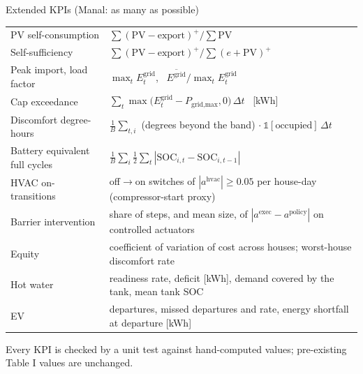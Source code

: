 \documentclass[aspectratio=169,10pt]{beamer}
\newcommand{\SOC}{\mathrm{SOC}}
\begin{document}
\begin{frame}{Extended KPIs (Manal: as many as possible)}
\small
\begin{tabularx}{\textwidth}{@{}l>{\raggedright\arraybackslash}X@{}}
\toprule
PV self-consumption & $\sum (\mathrm{PV} - \text{export})^+ / \sum \mathrm{PV}$ \\
Self-sufficiency & $\sum (\mathrm{PV} - \text{export})^+ / \sum (e + \mathrm{PV})^+$ \\
Peak import, load factor & $\max_t E^{\text{grid}}_t$, \ $\overline{E^{\text{grid}}} / \max_t E^{\text{grid}}_t$ \\
Cap exceedance & $\sum_t \max\big(E^{\text{grid}}_t - P_{\text{grid,max}}, 0\big)\,\Delta t$ \ [kWh] \\
Discomfort degree-hours & $\frac1B\sum_{t,i}$ (degrees beyond the band) $\cdot\ \mathbb 1[\text{occupied}]\,\Delta t$ \\
Battery equivalent full cycles & $\frac1B \sum_i \frac12 \sum_t |\SOC_{i,t} - \SOC_{i,t-1}|$ \\
HVAC on-transitions & off$\rightarrow$on switches of $|a^{\text{hvac}}| \ge 0.05$ per house-day (compressor-start proxy) \\
Barrier intervention & share of steps, and mean size, of $|a^{\text{exec}} - a^{\text{policy}}|$ on controlled actuators \\
Equity & coefficient of variation of cost across houses; worst-house discomfort rate \\
Hot water & readiness rate, deficit [kWh], demand covered by the tank, mean tank SOC \\
EV & departures, missed departures and rate, energy shortfall at departure [kWh] \\
\bottomrule
\end{tabularx}
\vspace{0.3em}

Every KPI is checked by a unit test against hand-computed values; pre-existing Table I values are unchanged.
\end{frame}
\end{document}
